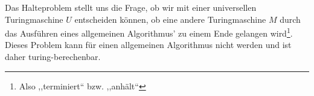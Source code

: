 Das Halteproblem stellt uns die Frage, ob wir mit einer universellen Turingmaschine $U$ entscheiden können, ob eine andere Turingmaschine $M$ durch das Ausführen eines allgemeinen Algorithmus' zu einem Ende gelangen wird\footnote{Also ,,terminiert`` bzw. ,,anhält``}. Dieses Problem kann für einen allgemeinen Algorithmus nicht werden und ist daher turing-berechenbar.
